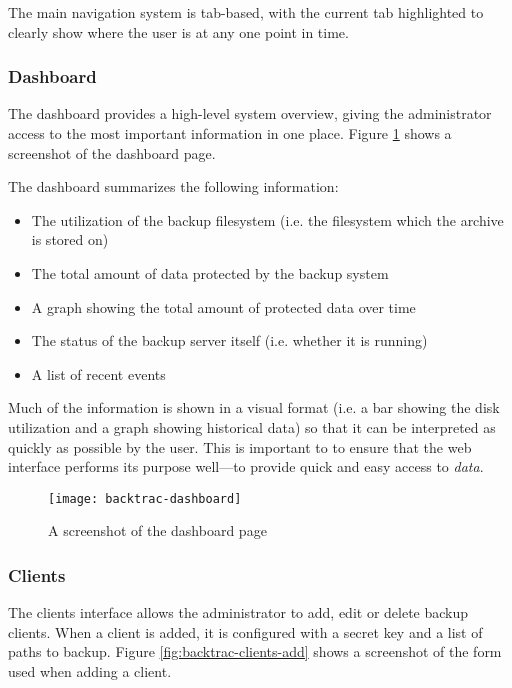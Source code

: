 The main navigation system is tab-based, with the current tab highlighted to
clearly show where the user is at any one point in time.

\subsubsection{Dashboard}
\label{sec:implementation-web-dashboard}

The dashboard provides a high-level system overview, giving the administrator
access to the most important information in one place. Figure
\ref{fig:backtrac-dashboard} shows a screenshot of the dashboard page.

The dashboard summarizes the following information:

\begin{itemize}
    \item The utilization of the backup filesystem (i.e. the filesystem which
        the archive is stored on)
    \item The total amount of data protected by the backup system
    \item A graph showing the total amount of protected data over time
    \item The status of the backup server itself (i.e. whether it is running)
    \item A list of recent events
\end{itemize}

Much of the information is shown in a visual format (i.e. a bar showing the
disk utilization and a graph showing historical data) so that it can be
interpreted as quickly as possible by the user. This is important to to ensure
that the web interface performs its purpose well---to provide quick and easy
access to \emph{data}.

\begin{figure}
    \begin{center}
        \texttt{[image: backtrac-dashboard]}
    \end{center}
    \caption{A screenshot of the dashboard page}
    \label{fig:backtrac-dashboard}
\end{figure}

\subsubsection{Clients}
\label{sec:implementation-web-clients}

The clients interface allows the administrator to add, edit or delete backup
clients. When a client is added, it is configured with a secret key and a list
of paths to backup. Figure \ref{fig:backtrac-clients-add} shows a screenshot of
the form used when adding a client.


